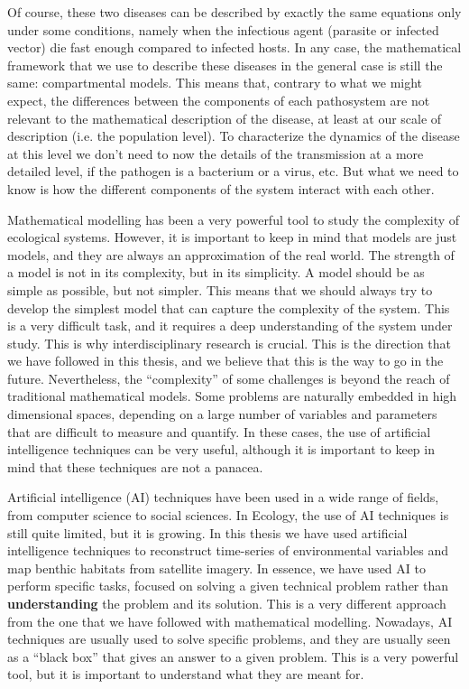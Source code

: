 Of course, these two diseases can be described by exactly the same equations
only under some conditions, namely when the infectious agent (parasite or
infected vector) die fast enough compared to infected hosts. In any case, the
mathematical framework that we use to describe these diseases in the general
case is still the same: compartmental models. This means that, contrary to what
we might expect, the differences between the components of each pathosystem are
not relevant to the mathematical description of the disease, at least at our
scale of description (i.e. the population level). To characterize the dynamics
of the disease at this level we don't need to now the details of the
transmission at a more detailed level, if the pathogen is a bacterium or a
virus, etc. But what we need to know is how the different components of the
system interact with each other.

Mathematical modelling has been a very powerful tool to study the complexity of
ecological systems. However, it is important to keep in mind that models are
just models, and they are always an approximation of the real world. The
strength of a model is not in its complexity, but in its simplicity. A model
should be as simple as possible, but not simpler. This means that we should
always try to develop the simplest model that can capture the complexity of the
system. This is a very difficult task, and it requires a deep understanding of
the system under study. This is why interdisciplinary research is
crucial. This is the direction that we have followed in this thesis, and we
believe that this is the way to go in the future. Nevertheless, the
``complexity'' of some challenges is beyond the reach of traditional
mathematical models. Some problems are naturally embedded in high dimensional
spaces, depending on a large number of variables and parameters that are
difficult to measure and quantify. In these cases, the use of artificial
intelligence techniques can be very useful, although it is important to keep in
mind that these techniques are not a panacea.


Artificial intelligence (AI) techniques have been used in a wide range of
fields, from computer science to social sciences. In Ecology, the use of
AI techniques is still quite limited, but it is growing. In this thesis we have
used artificial intelligence techniques to reconstruct time-series of
environmental variables and map benthic habitats from satellite imagery. In
essence, we have used AI to perform specific tasks, focused on solving a given
technical problem rather than \textbf{understanding} the problem and its
solution. This is a very different approach from the one that we have followed
with mathematical modelling. Nowadays, AI techniques are usually used to solve
specific problems, and they are usually seen as a ``black box'' that gives an
answer to a given problem. This is a very powerful tool, but it is important to
understand what they are meant for.

